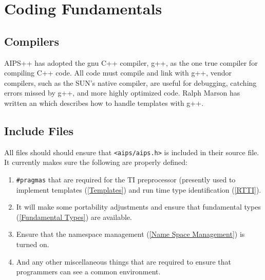 \chapter{Coding Fundamentals}

\section{Compilers}
AIPS++ has adopted the gnu C++ compiler, g++, as the one true compiler
for compiling C++ code.  All code must compile and link with g++, vendor
compilers, such as the SUN's native compiler, are useful for debugging,
catching errors missed by g++, and more highly optimized code. 
Ralph Marson has written an
 which describes
how to handle templates with g++.

\section{Include Files}

All files should should ensure that {\tt <aips/aips.h>} is included in
their source file. It currently makes sure the following are properly
defined:
\begin{enumerate}
\item
{\tt \#pragmas} that are required for the TI preprocessor (presently
used to implement templates (\ref{Templates}) and run time type
identification (\ref{RTTI}).
\item
It will make some portability adjustments and ensure that fundamental
types (\ref{Fundamental Types}) are available.
\item
Ensure that the namespace management (\ref{Name Space Management}) is
turned on.
\item
And any other miscellaneous things that are required to ensure that 
programmers can see a common environment.
\end{enumerate}

